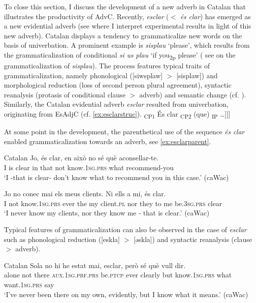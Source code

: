 To close this section, I discuss the  development of a new  adverb in Catalan that illustrates the productivity of AdvC. Recently, \textit{esclar} ($<$ \textit{és clar}) has emerged as a new evidential adverb (see  where I  interpret  experimental results  in light of this new adverb).
Catalan displays a tendency to grammaticalize new words on the basis of univerbation. A prominent example is \textit{sisplau} `please', which results from the grammaticalization of conditional  \textit{si us plau} `if you\textsubscript{2p} please' ( see \citealt{Alturo2009} on the grammaticalization of \textit{sisplau}). The process features typical traits  of grammaticalization, namely phonological  ([siwsplaw] $>$ [sisplaw]) and morphological reduction (loss of second person plural agreement), syntactic reanalysis (protasis of conditional clause $>$ adverb) and semantic change (cf. \citealt{HopperTraugott2003}).
Similarly, the Catalan evidential adverb \textit{esclar} resulted from univerbation, originating from  EsAdjC (cf. \ref{ex:esclarstruc}).
\ea\label{ex:esclarstruc} {\ob}\textsubscript{CP1} És clar {\ob}\textsubscript{CP2} (que) {\ob}\textsubscript{IP} \ldots ]]]\\
\z

At some point in the development, the parenthetical use of the sequence \textit{és clar} enabled  grammaticalization towards an adverb, see \eqref{ex:esclarparent}.


\ea \label{ex:esclarparent}Catalan
\ea 
\gll
		Jo, és clar, en això no sé què aconsellar-te. \\
		I is clear in that not know.\textsc{1sg.prs} what recommend-you\\
		\glt `I -that is clear- don't know what to recommend you in this case.' (caWac)
		\ex

		\gll Jo no conec mai els meus clients. Ni ells a mi, és clar. \\
		I not know.\textsc{1sg.prs} ever the my client.\textsc{pl} nor they to me be.\textsc{3sg.prs} clear\\
		\glt `I never know my clients, nor they know me - that is clear.' (caWac)
	\z
\z

Typical features of grammaticalization can also be observed in the case of \textit{esclar} such  as phonological reduction ([eskla] $>$ [əskla]) and syntactic reanalysis (clause $>$ adverb). 

\ea\label{ex:esclarmobile} Catalan
\ea
\gll Sola no hi he estat mai, {esclar}, però sé què vull dir. \\
		alone not there \textsc{aux.1sg.prf.prs} be.\textsc{ptcp} ever clearly but know.\textsc{1sg.prs} what want.\textsc{1sg.prs} say\\
		\glt `I've never been there on my own, evidently, but I know what it means.' (caWac)
	
